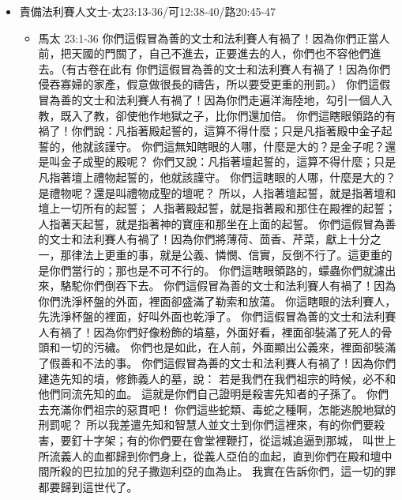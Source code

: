 \begin{itemize}
\item{責備法利賽人文士-太23:13-36/可12:38-40/路20:45-47}
\begin{itemize}
\item{馬太 23:1-36}
你們這假冒為善的文士和法利賽人有禍了！因為你們正當人前，把天國的門關了，自己不進去，正要進去的人，你們也不容他們進去。（有古卷在此有
你們這假冒為善的文士和法利賽人有禍了！因為你們侵吞寡婦的家產，假意做很長的禱告，所以要受更重的刑罰。）
你們這假冒為善的文士和法利賽人有禍了！因為你們走遍洋海陸地，勾引一個人入教，既入了教，卻使他作地獄之子，比你們還加倍。
你們這瞎眼領路的有禍了！你們說：凡指著殿起誓的，這算不得什麼；只是凡指著殿中金子起誓的，他就該謹守。
你們這無知瞎眼的人哪，什麼是大的？是金子呢？還是叫金子成聖的殿呢？
你們又說：凡指著壇起誓的，這算不得什麼；只是凡指著壇上禮物起誓的，他就該謹守。
你們這瞎眼的人哪，什麼是大的？是禮物呢？還是叫禮物成聖的壇呢？
所以，人指著壇起誓，就是指著壇和壇上一切所有的起誓；
人指著殿起誓，就是指著殿和那住在殿裡的起誓；
人指著天起誓，就是指著神的寶座和那坐在上面的起誓。
你們這假冒為善的文士和法利賽人有禍了！因為你們將薄荷、茴香、芹菜，獻上十分之一，那律法上更重的事，就是公義、憐憫、信實，反倒不行了。這更重的是你們當行的；那也是不可不行的。
你們這瞎眼領路的，蠓蟲你們就濾出來，駱駝你們倒吞下去。
你們這假冒為善的文士和法利賽人有禍了！因為你們洗淨杯盤的外面，裡面卻盛滿了勒索和放蕩。
你這瞎眼的法利賽人，先洗淨杯盤的裡面，好叫外面也乾淨了。
你們這假冒為善的文士和法利賽人有禍了！因為你們好像粉飾的墳墓，外面好看，裡面卻裝滿了死人的骨頭和一切的污穢。
你們也是如此，在人前，外面顯出公義來，裡面卻裝滿了假善和不法的事。
你們這假冒為善的文士和法利賽人有禍了！因為你們建造先知的墳，修飾義人的墓，說：
若是我們在我們祖宗的時候，必不和他們同流先知的血。
這就是你們自己證明是殺害先知者的子孫了。
你們去充滿你們祖宗的惡貫吧！
你們這些蛇類、毒蛇之種啊，怎能逃脫地獄的刑罰呢？
所以我差遣先知和智慧人並文士到你們這裡來，有的你們要殺害，要釘十字架；有的你們要在會堂裡鞭打，從這城追逼到那城，
叫世上所流義人的血都歸到你們身上，從義人亞伯的血起，直到你們在殿和壇中間所殺的巴拉加的兒子撒迦利亞的血為止。
我實在告訴你們，這一切的罪都要歸到這世代了。


\end{itemize}
\end{itemize}
